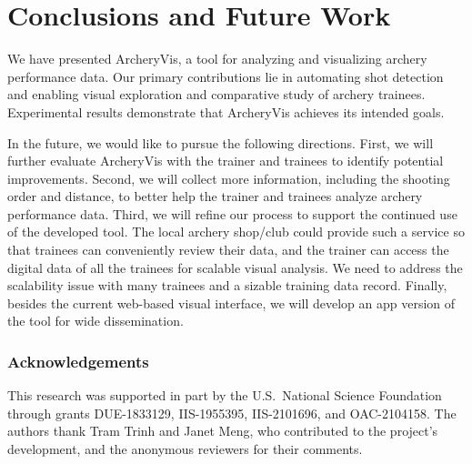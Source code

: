 \documentclass[runningheads]{llncs}
\begin{document}
\section{Conclusions and Future Work}

We have presented ArcheryVis, a tool for analyzing and visualizing archery performance data. 
Our primary contributions lie in automating shot detection and enabling visual exploration and comparative study of archery trainees. 
Experimental results demonstrate that ArcheryVis achieves its intended goals. 

In the future, we would like to pursue the following directions. 
First, we will further evaluate ArcheryVis with the trainer and trainees to identify potential improvements.  
Second, we will collect more information, including the shooting order and distance, to better help the trainer and trainees analyze archery performance data. 
Third, we will refine our process to support the continued use of the developed tool. The local archery shop/club could provide such a service so that trainees can conveniently review their data, and the trainer can access the digital data of all the trainees for scalable visual analysis.  
We need to address the scalability issue with many trainees and a sizable training data record. 
Finally, besides the current web-based visual interface, we will develop an app version of the tool for wide dissemination.

\subsubsection{Acknowledgements} 
This research was supported in part by the U.S.\ National Science Foundation through grants DUE-1833129, IIS-1955395, IIS-2101696, and OAC-2104158. The authors thank Tram Trinh and Janet Meng, who contributed to the project's development, and the anonymous reviewers for their comments.
%
%
%


\end{document}
